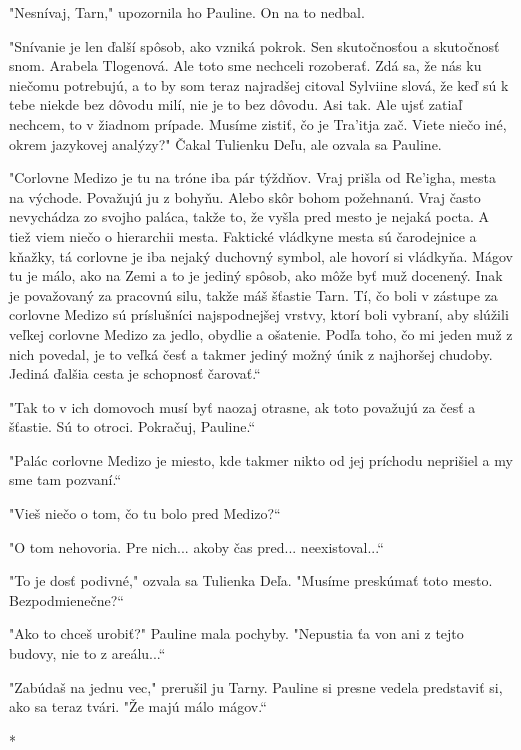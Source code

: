 \documentclass{book}
\begin{document}
"$ $Nesnívaj, Tarn,"$ $ upozornila ho Pauline. On na to nedbal.

"$ $Snívanie je len ďalší spôsob, ako vzniká pokrok. Sen skutočnosťou a skutočnosť snom. Arabela Tlogenová. Ale toto sme nechceli rozoberať. Zdá sa, že nás ku niečomu potrebujú, a to by som teraz najradšej citoval Sylviine slová, že keď sú k tebe niekde bez dôvodu milí, nie je to bez dôvodu. Asi tak. Ale ujsť zatiaľ nechcem, to v žiadnom prípade. Musíme zistiť, čo je Tra'itja zač. Viete niečo iné, okrem jazykovej analýzy?"$ $ Čakal Tulienku Deľu, ale ozvala sa Pauline.

"$ $Corlovne Medizo je tu na tróne iba pár týždňov. Vraj prišla od Re'igha, mesta na východe. Považujú ju z bohyňu. Alebo skôr bohom požehnanú. Vraj často nevychádza zo svojho paláca, takže to, že vyšla pred mesto je nejaká pocta. A tiež viem niečo o hierarchii mesta. Faktické vládkyne mesta sú čarodejnice a kňažky, tá corlovne je iba nejaký duchovný symbol, ale hovorí si vládkyňa. Mágov tu je málo, ako na Zemi a to je jediný spôsob, ako môže byť muž docenený. Inak je považovaný za pracovnú silu, takže máš šťastie Tarn. Tí, čo boli v zástupe za corlovne Medizo sú príslušníci najspodnejšej vrstvy, ktorí boli vybraní, aby slúžili veľkej corlovne Medizo za jedlo, obydlie a ošatenie. Podľa toho, čo mi jeden muž z nich povedal, je to veľká česť a takmer jediný možný únik z najhoršej chudoby. Jediná ďalšia cesta je schopnosť čarovať.“

"$ $Tak to v ich domovoch musí byť naozaj otrasne, ak toto považujú za česť a šťastie. Sú to otroci. Pokračuj, Pauline.“

"$ $Palác corlovne Medizo je miesto, kde takmer nikto od jej príchodu neprišiel a my sme tam pozvaní.“

"$ $Vieš niečo o tom, čo tu bolo pred Medizo?“

"$ $O tom nehovoria. Pre nich... akoby čas pred... neexistoval...“

"$ $To je dosť podivné,"$ $ ozvala sa Tulienka Deľa. "$ $Musíme preskúmať toto mesto. Bezpodmienečne?“

"$ $Ako to chceš urobiť?"$ $ Pauline mala pochyby. "$ $Nepustia ťa von ani z tejto budovy, nie to z areálu...“

"$ $Zabúdaš na jednu vec,"$ $ prerušil ju Tarny. Pauline si presne vedela predstaviť si, ako sa teraz tvári. "$ $Že majú málo mágov.“

\begin{center}
*
\end{center}
\end{document}
